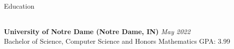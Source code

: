 \documentclass[10pt]{resume} %
\begin{document}

\begin{rSection}{Education}

\\{\bf University of Notre Dame (Notre Dame, IN) } \hfill { \em May 2022 } 
\\ Bachelor of Science, Computer Science and Honors Mathematics\hfill { GPA: 3.99 }


\end{rSection}



\end{document}
